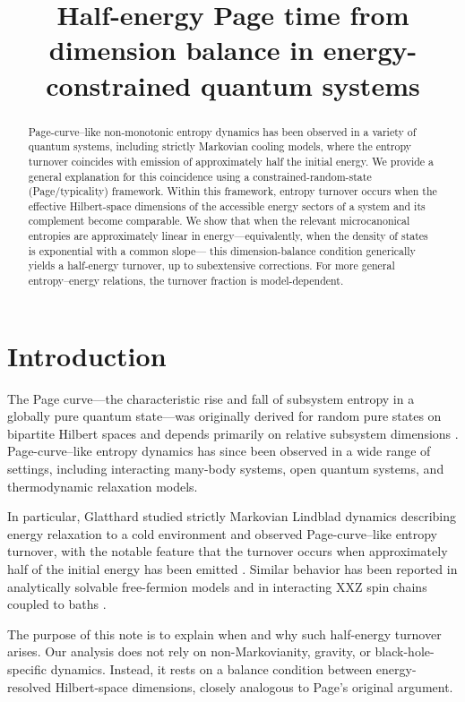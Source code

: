 \documentclass[11pt]{article}
\title{Half-energy Page time from dimension balance in energy-constrained quantum systems}
\author{}
\date{}
\begin{document}
\maketitle

\begin{abstract}
Page-curve--like non-monotonic entropy dynamics has been observed in a variety of
quantum systems, including strictly Markovian cooling models, where the entropy
turnover coincides with emission of approximately half the initial energy.
We provide a general explanation for this coincidence using a constrained-random-state
(Page/typicality) framework.
Within this framework, entropy turnover occurs when the effective Hilbert-space
dimensions of the accessible energy sectors of a system and its complement become
comparable.
We show that when the relevant microcanonical entropies are approximately linear in
energy---equivalently, when the density of states is exponential with a common slope---
this dimension-balance condition generically yields a half-energy turnover, up to
subextensive corrections.
For more general entropy--energy relations, the turnover fraction is model-dependent.
\end{abstract}

\section{Introduction}

The Page curve---the characteristic rise and fall of subsystem entropy in a globally
pure quantum state---was originally derived for random pure states on bipartite
Hilbert spaces and depends primarily on relative subsystem dimensions \cite{Page1993}.
Page-curve--like entropy dynamics has since been observed in a wide range of settings,
including interacting many-body systems, open quantum systems, and thermodynamic
relaxation models.

In particular, Glatthard studied strictly Markovian Lindblad dynamics describing energy
relaxation to a cold environment and observed Page-curve--like entropy turnover, with
the notable feature that the turnover occurs when approximately half of the initial
energy has been emitted \cite{Glatthard2025}. Similar behavior has been reported in
analytically solvable free-fermion models \cite{Kehrein2024} and in interacting XXZ
spin chains coupled to baths \cite{RayDharKulkarni2025}.

The purpose of this note is to explain when and why such half-energy turnover arises.
Our analysis does not rely on non-Markovianity, gravity, or black-hole-specific
dynamics. Instead, it rests on a balance condition between energy-resolved Hilbert-space
dimensions, closely analogous to Page’s original argument.
\end{document}
